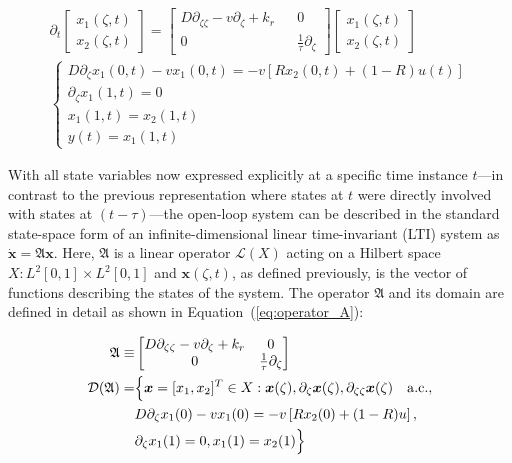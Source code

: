 \begin{align}
    \partial_t 
    \begin{bmatrix}
        x_1(\zeta, t) \\ x_2(\zeta,t)
    \end{bmatrix}
    =
    \begin{bmatrix}
        D \partial_{\zeta \zeta} - v \partial_\zeta + k_r && 0 \\
        0 && \frac{1}{\tau} \partial_\zeta
    \end{bmatrix}
    \begin{bmatrix}
        x_1(\zeta, t) \\ x_2(\zeta,t)
    \end{bmatrix}\\
\begin{cases}
    D \partial_\zeta x_1(0, t) - v x_1(0, t) = -v \left[ R x_2(0, t) + (1-R) u(t) \right] \\
    \partial_\zeta x_1(1, t) = 0 \\
    x_1(1,t) = x_2(1,t) \\
    y(t) = x_1(1, t)
\end{cases}
\end{align}

With all state variables now expressed explicitly at a specific time instance $t$—in contrast to the previous representation where states at $t$ were directly involved with states at $(t-\tau)$—the open-loop system can be described in the standard state-space form of an infinite-dimensional linear time-invariant (LTI) system as $\dot{\bm{x}} = \mathfrak{A} \bm{x}$. Here, $\mathfrak{A}$ is a linear operator $\mathcal{L}(X)$ acting on a Hilbert space $X: L^2[0,1] \times L^2[0,1]$ and $\bm{x}(\zeta,t)$, as defined previously, is the vector of functions describing the states of the system. The operator $\mathfrak{A}$ and its domain are defined in detail as shown in Equation~(\ref{eq:operator_A}):

\begin{equation} \label{eq:operator_A}
    \begin{aligned}
        \mathfrak{A} \equiv&
        \begin{bmatrix}
            D \partial_{\zeta \zeta} - v \partial_\zeta + k_r & 0 \\
            0 & \frac{1}{\tau} \partial_\zeta
        \end{bmatrix}\\
        \mathcal{D}(\mathfrak{A}) =& \Bigl\{ \bm{x} = [x_1, x_2]^T \in X:
        \bm{x}(\zeta), \partial_\zeta \bm{x}(\zeta), \partial_{\zeta \zeta} \bm{x}(\zeta) \quad \mathrm{a.c.},\\
        &D \partial_\zeta x_1(0) - v x_1(0) = -v \left[ R x_2(0) + (1-R) u \right],\\
        &\partial_\zeta x_1(1) = 0,
        x_1(1) = x_2(1) \Bigr\}
    \end{aligned}
\end{equation}

